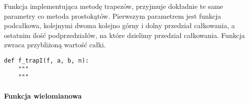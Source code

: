 \documentclass[12pt,twoside]{article}
\begin{document}
Funkcja implementująca metodę trapezów, przyjmuje dokładnie te same parametry co metoda prostokątów. Pierwszym parametrem jest funkcja podcałkowa, kolejnymi dwoma kolejno górny i dolny przedział całkowania, a ostatnim  ilość podprzedziałów, na które dzielimy przedział całkowania. Funkcja zwraca przybliżoną wartość całki.

\begin{lstlisting}[caption={Kod w języku python implementujący metodę trapezów}]
def f_trapI(f, a, b, n):
    """
    """
\end{lstlisting}
\label{Listing 7}

\paragraph{Funkcja wielomianowa}\mbox{} \\
\end{document}
